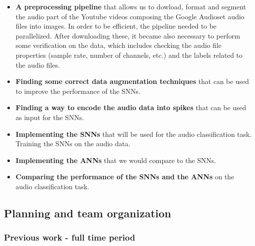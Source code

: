 \documentclass[11pt]{article}
\begin{document}
\begin{itemize}
  \item \textbf{A preprocessing pipeline} that allows us to dowload, format and segment the audio part of the Youtube videos composing the Google Audioset audio files into images.
        In order to be efficient, the pipeline needed to be parallelized.
        \subitem After downloading these, it became also necessary to perform some verification on the data, which includes checking the audio file properties (sample rate, number of channels, etc.) and the labels related to the audio files.
  \item \textbf{Finding some correct data augmentation techniques} that can be used to improve the performance of the SNNs.
  \item \textbf{Finding a way to encode the audio data into spikes} that can be used as input for the SNNs.
\end{itemize}

\begin{itemize}
  \item \textbf{Implementing the SNNs} that will be used for the audio classification task.
        \subitem Training the SNNs on the audio data.
  \item \textbf{Implementing the ANNs} that we would compare to the SNNs.
  \item \textbf{Comparing the performance of the SNNs and the ANNs} on the audio classification task.
\end{itemize}


\subsection{Planning and team organization}

\subsubsection{Previous work - full time period}
\end{document}
